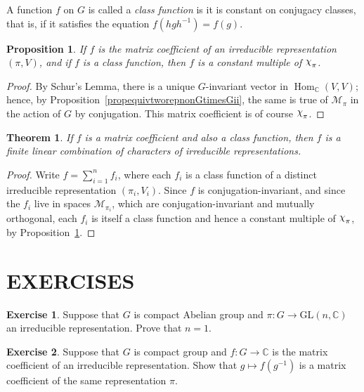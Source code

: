 \documentclass[12pt,reqno]{book}%
\newtheorem{theorem}{Theorem}[chapter]
\newtheorem{proposition}{Proposition}[chapter]
\theoremstyle{definition}
\newtheorem{exercise}{Exercise}[chapter]
\theoremstyle{remark}
\theoremstyle{theorem}
\theoremstyle{remark}
\newcommand{\mychi}{\raisebox{2pt}{$\chi$}}
\DeclareMathOperator{\Hom}{Hom}
\begin{document}
A function $f$ on $G$ is called a \emph{class function} is it is constant on conjugacy classes, that is, if it satisfies the equation $f(hgh^{-1}) = f(g)$.

\begin{proposition}\label{prop2.12}%
    If $f$ is the matrix coefficient of an irreducible representation $(\pi, V)$, and if $f$ is a class function, then $f$ is a constant multiple of $\mychi_\pi$.
\end{proposition}%
\begin{proof}%
    By Schur's Lemma, there is a unique $G$-invariant vector in $\Hom_{\mathbb{C}}(V, V)$; hence, by Proposition~\ref{propequivtworepnonGtimesGii}, the same is true of $\mathcal{M}_\pi$ in the action of $G$ by conjugation.
    This matrix coefficient is of course $\mychi_\pi$.
\end{proof}%

\begin{theorem}\label{thm2.6}%
    If $f$ is a matrix coefficient and also a class function, then $f$ is a finite linear combination of characters of irreducible representations.
\end{theorem}%
\begin{proof}%
    Write $f = \sum_{i=1}^{n} f_i$, where each $f_i$ is a class function of a distinct irreducible representation $(\pi_i, V_i)$.
    Since $f$ is conjugation-invariant, and since the $f_i$ live in spaces $\mathcal{M}_{\pi_i}$, which are conjugation-invariant and mutually orthogonal, each $f_i$ is itself a class function and hence a constant multiple of $\mychi_\pi$, by Proposition~\ref{prop2.12}.
\end{proof}%


\section*{EXERCISES}%
\begin{exercise}\label{}
    Suppose that $G$ is compact Abelian group and $\pi : G \to \mathrm{GL}(n, \mathbb{C})$ an irreducible representation.
    Prove that $n=1$.
\end{exercise}

\begin{exercise}\label{}
    Suppose that $G$ is compact group and $f : G \to \mathbb{C}$ is the matrix coefficient of an irreducible representation.
    Show that $g \mapsto f(g^{-1})$ is a matrix coefficient of the same representation $\pi$.
\end{exercise}
\end{document}
